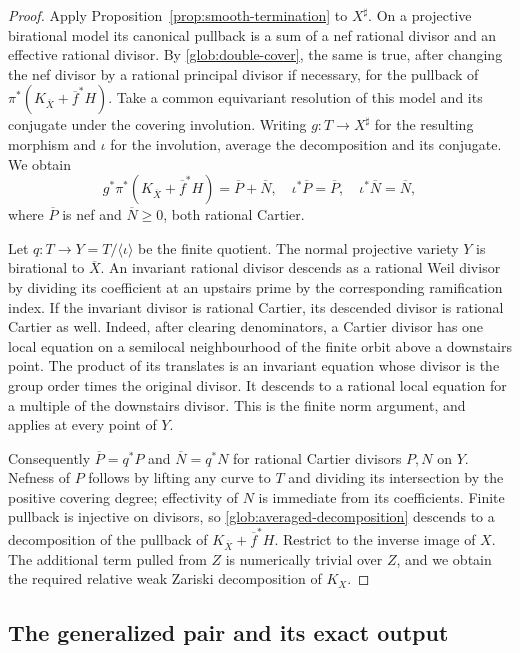 \begin{proof}
Apply Proposition~\ref{prop:smooth-termination} to $X^\sharp$.  On a
projective birational model its canonical pullback is a sum of a nef
rational divisor and an effective rational divisor.  By
\eqref{glob:double-cover}, the same is true, after changing the nef
divisor by a rational principal divisor if necessary, for the pullback
of $\pi^*(K_{\overline X}+\overline f^*H)$.  Take a common equivariant
resolution of this model and its conjugate under the covering involution.
Writing $g:T\to X^\sharp$ for the resulting morphism and $\iota$ for the
involution, average the decomposition and its conjugate.  We obtain
\begin{equation}\label{glob:averaged-decomposition}
 g^*\pi^*(K_{\overline X}+\overline f^*H)
   =\overline P+\overline N,
 \quad \iota^*\overline P=\overline P,
 \quad \iota^*\overline N=\overline N,
\end{equation}
where $\overline P$ is nef and $\overline N\geq0$, both rational Cartier.

Let $q:T\to Y=T/\langle\iota\rangle$ be the finite quotient.  The normal
projective variety $Y$ is birational to $\overline X$.  An invariant
rational divisor descends as a rational Weil divisor by dividing its
coefficient at an upstairs prime by the corresponding ramification
index.  If the invariant divisor is rational Cartier, its descended
divisor is rational Cartier as well.  Indeed, after clearing
denominators, a Cartier divisor has one local equation on a semilocal
neighbourhood of the finite orbit above a downstairs point.  The product
of its translates is an invariant equation whose divisor is the group
order times the original divisor.  It descends to a rational local
equation for a multiple of the downstairs divisor.  This is the finite
norm argument, and applies at every point of $Y$.

Consequently $\overline P=q^*P$ and $\overline N=q^*N$ for rational
Cartier divisors $P,N$ on $Y$.  Nefness of $P$ follows by lifting any
curve to $T$ and dividing its intersection by the positive covering
degree; effectivity of $N$ is immediate from its coefficients.  Finite
pullback is injective on divisors, so
\eqref{glob:averaged-decomposition} descends to a decomposition of the
pullback of $K_{\overline X}+\overline f^*H$.  Restrict to the inverse
image of $X$.  The additional term pulled from $Z$ is numerically trivial
over $Z$, and we obtain the required relative weak Zariski decomposition
of $K_X$.
\end{proof}

\subsection{The generalized pair and its exact output}


